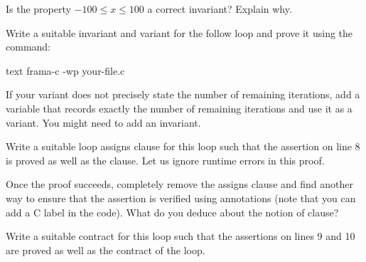 

Is the property $-100 \leq x \leq 100$ a correct invariant? Explain why.






Write a suitable invariant and variant for the follow loop and prove it
using the command:

\begin{CodeBlock}{text}
frama-c -wp your-file.c
\end{CodeBlock}




If your variant does not precisely state the number of remaining
iterations, add a variable that records exactly the number of remaining
iterations and use it as a variant. You might need to add an invariant.






Write a suitable loop assigns clause for this loop such that the assertion
on line 8 is proved as well as the  clause. Let us ignore
runtime errors in this proof.






Once the proof succeeds, completely remove the assigns clause and find
another way to ensure that the assertion is verified using annotations (note
that you can add a C label in the code). What do you deduce about the notion
of  clause?






Write a suitable contract for this loop such that the assertions on lines
9 and 10 are proved as well as the contract of the loop.




